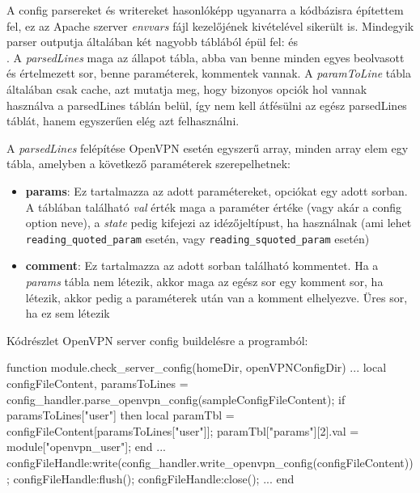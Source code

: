 A config parsereket és writereket hasonlóképp ugyanarra a kódbázisra építettem fel, ez az Apache szerver \textit{envvars} fájl kezelőjének kivételével sikerült is. Mindegyik parser outputja általában két nagyobb táblából épül fel: \texttt{} és\\\texttt{}.
A \textit{parsedLines} maga az állapot tábla, abba van benne minden egyes beolvasott és értelmezett sor, benne paraméterek, kommentek vannak. A \textit{paramToLine} tábla általában csak cache, azt mutatja meg, hogy bizonyos opciók hol vannak használva a parsedLines táblán belül, így nem kell átfésülni az egész parsedLines táblát, hanem egyszerűen elég azt felhasználni.

A \textit{parsedLines} felépítése OpenVPN esetén egyszerű array, minden array elem egy tábla, amelyben a következő paraméterek szerepelhetnek:

\begin{itemize}
	\item \textbf{params}: Ez tartalmazza az adott paramétereket, opciókat egy adott sorban. A táblában található \textit{val} érték maga a paraméter értéke (vagy akár a config option neve), a \textit{state} pedig kifejezi az idézőjeltípust, ha használnak (ami lehet \texttt{reading\_quoted\_param}  esetén, vagy \texttt{reading\_squoted\_param}  esetén)
	\item \textbf{comment}: Ez tartalmazza az adott sorban található kommentet. Ha a \textit{params} tábla nem létezik, akkor maga az egész sor egy komment sor, ha létezik, akkor pedig a paraméterek után van a komment elhelyezve. Üres sor, ha ez sem létezik
\end{itemize}

Kódrészlet OpenVPN server config buildelésre a programból:

\begin{lua}
function module.check_server_config(homeDir, openVPNConfigDir)
	...
        local configFileContent, paramsToLines = config_handler.parse_openvpn_config(sampleConfigFileContent);
        if paramsToLines["user"] then
            local paramTbl = configFileContent[paramsToLines["user"]];
            paramTbl["params"][2].val = module["openvpn_user"];
        end
	...
        configFileHandle:write(config_handler.write_openvpn_config(configFileContent));
        configFileHandle:flush();
        configFileHandle:close();
	...
end
\end{lua}
\pagebreak

